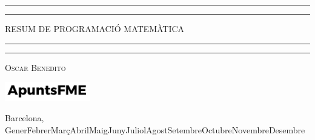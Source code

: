 \newcommand{\plogo}{\fbox{$\mathcal{PL}$}} %
{

    \centering %

    \scshape %

    \rule{\textwidth}{1.6pt}\vspace*{-\baselineskip}\vspace*{2pt} %
    \rule{\textwidth}{0.4pt} %

    \vspace{0.40\baselineskip} %

    {\LARGE RESUM DE PROGRAMACIÓ MATEMÀTICA} %

    \vspace{0.01\baselineskip} %

    \rule{\textwidth}{0.4pt}\vspace*{-\baselineskip}\vspace{3.2pt} %
    \rule{\textwidth}{1.6pt} %

    \vspace{0.5\baselineskip} %

    {\scshape\large Oscar Benedito\\} %

    \vspace{1\baselineskip} %

    \includegraphics[width=3.7cm]{../logo.pdf}

    \vspace{-0.3\baselineskip} %
    
        
    Barcelona, {\ifcase \month \or Gener\or Febrer\or Març\or Abril\or Maig\or Juny\or Juliol\or Agost\or Setembre\or Octubre\or Novembre\or Desembre\fi \:  \number \year} %


    
    \thispagestyle{empty}
}

